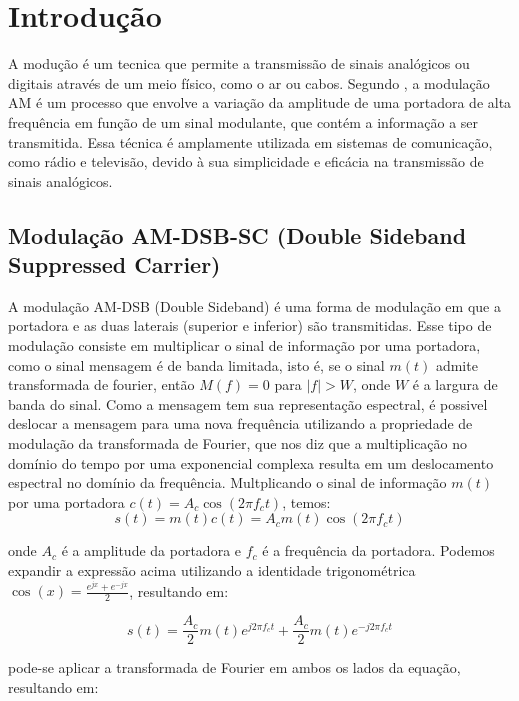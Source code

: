 \section{Introdução}

A modução é um tecnica que permite a transmissão de sinais analógicos ou digitais através de um meio físico, como o ar ou cabos.
Segundo \cite{b12}, a modulação AM é um processo que envolve a variação da amplitude de uma portadora de alta frequência em função de um sinal modulante, que contém a informação a ser transmitida. Essa técnica é amplamente utilizada em sistemas de comunicação, como rádio e televisão, devido à sua simplicidade e eficácia na transmissão de sinais analógicos.


\subsection{Modulação AM-DSB-SC (Double Sideband Suppressed Carrier)}
A modulação AM-DSB (Double Sideband) é uma forma de modulação em que a portadora e as duas laterais (superior e inferior) são transmitidas. Esse tipo de modulação consiste em multiplicar o sinal de informação por uma portadora, como o sinal mensagem é de banda limitada, isto é, se o sinal $m(t)$ admite transformada de fourier, então $M(f) = 0$ para $|f| > W$, onde $W$ é a largura de banda do sinal.
Como a mensagem tem sua representação espectral, é possivel deslocar a mensagem para uma nova frequência utilizando a propriedade de modulação da transformada de Fourier, que nos diz que a multiplicação no domínio do tempo por uma exponencial complexa resulta em um deslocamento espectral no domínio da frequência. Multplicando o sinal de informação $m(t)$ por uma portadora $c(t) = A_{c} \cos(2 \pi f_{c} t)$, temos:
\begin{equation}
    s(t) = m(t) c(t) = A_{c} m(t) \cos(2 \pi f_{c} t)
\end{equation}

onde $A_{c}$ é a amplitude da portadora e $f_{c}$ é a frequência da portadora. Podemos expandir a expressão acima utilizando a identidade trigonométrica $\cos(x) = \frac{e^{jx} + e^{-jx}}{2}$, resultando em:

\begin{equation}
    s(t) = \frac{A_{c}}{2} m(t) e^{j 2 \pi f_{c} t} + \frac{A_{c}}{2} m(t) e^{-j 2 \pi f_{c} t}
\end{equation}

pode-se aplicar a transformada de Fourier em ambos os lados da equação, resultando em:

